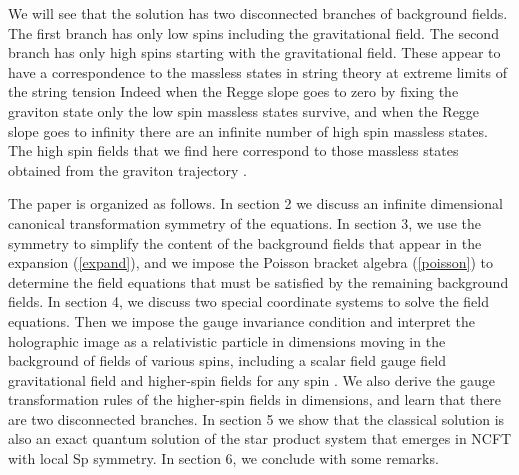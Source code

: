 \documentclass[a4paper,12pt]{article}
\begin{document}
We will see that the solution has two disconnected branches of background
fields. The first branch has only low spins \coordHE{} including the
gravitational field. The second branch has only high spins \coordHE{}
starting with the gravitational field. These appear to have a correspondence
to the massless states in string theory at extreme limits of the string
tension \coordHE{} Indeed when the
Regge slope \myHighlight{$\alpha ^{\prime }$}\coordHE{} goes to zero by fixing the graviton state
only the low spin \coordHE{} massless states survive, and when the Regge
slope \myHighlight{$\alpha ^{\prime }$}\coordHE{} goes to infinity there are an infinite number of
high spin massless states. The high spin fields that we find here correspond
to those massless states obtained from the graviton trajectory \coordHE{}.

The paper is organized as follows. In section 2 we discuss an infinite
dimensional canonical transformation symmetry of the equations. In section
3, we use the symmetry to simplify the content of the background fields that
appear in the expansion (\ref{expand}), and we impose the Poisson bracket
algebra (\ref{poisson}) to determine the field equations that must be
satisfied by the remaining background fields. In section 4, we discuss two
special coordinate systems to solve the field equations. Then we impose the
gauge invariance condition \coordHE{} and interpret the holographic image
as a relativistic particle in \coordHE{} dimensions \coordHE{} moving in the
background of fields of various spins, including a scalar field \coordHE{} gauge field \coordHE{} gravitational field \coordHE{} and higher-spin fields \coordHE{} for any spin \coordHE{}. We also derive the
gauge transformation rules of the higher-spin fields in \coordHE{} dimensions, and
learn that there are two disconnected branches. In section 5 we show that
the classical solution is also an exact quantum solution of the star product
system that emerges in NCFT with local Sp\myHighlight{$\left( 2\right) $}\coordHE{} symmetry. In
section 6, we conclude with some remarks.
\end{document}
